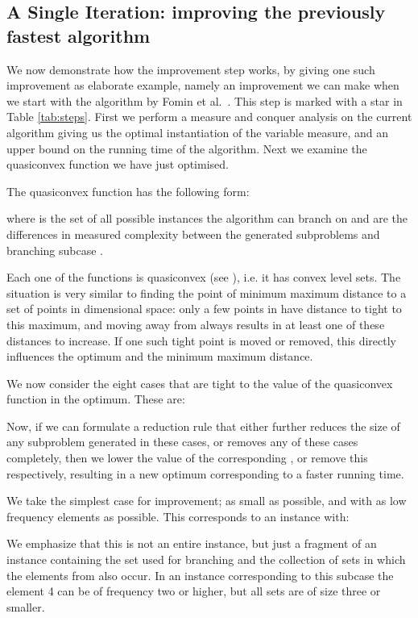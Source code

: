 \documentclass[fleqn]{stacs_proc}
\begin{document}
\subsection{A Single Iteration: improving the previously fastest algorithm}
We now demonstrate how the improvement step works, by giving one such
improvement as elaborate example, namely an improvement we can make when we
start with the algorithm by Fomin et al.~\cite{FominGK05a}.
This step is marked with a star in Table \ref{tab:steps}.
First we perform a measure and conquer analysis on the current algorithm
giving us the optimal instantiation of the variable measure,
and an upper bound on the running time of the algorithm.
Next we examine the quasiconvex function we have just optimised.

The quasiconvex function has the following form:

where  is the set of all possible instances the algorithm can branch on
and  are the differences in measured complexity between
the generated subproblems and branching subcase .

Each one of the functions  is quasiconvex (see \cite{Eppstein04}), i.e. it has convex level sets.
The situation is very similar to finding the point  of minimum maximum distance to
a set of points  in  dimensional space:
only a few points in  have distance to  tight to this maximum,
and moving away from  always results in at least one of these distances to increase.
If one such tight point is moved or removed, this directly influences the optimum  and the minimum maximum distance.



We now consider the eight cases that are tight to the value of the 
quasiconvex function  in the optimum.
These are:

Now, if we can formulate a reduction rule that either further reduces the size of any subproblem generated in these cases,
or removes any of these cases completely, then we lower the value of the corresponding ,
or remove this  respectively, resulting in a new optimum corresponding to a faster running time.

We take the simplest case for improvement;  as small as possible,
and with as low frequency elements as possible.
This corresponds to an instance with:

We emphasize that this is not an entire instance, but just a fragment of an instance containing the set  used for branching 
and the collection of sets in which the elements from  also occur.
In an instance corresponding to this subcase the element 4 can be of frequency two or higher, but all sets are of size three or smaller.
\end{document}
